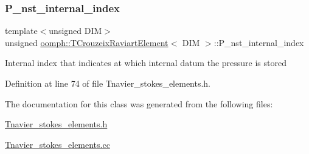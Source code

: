 \subsubsection{\texorpdfstring{P\+\_\+nst\+\_\+internal\+\_\+index}{P\_nst\_internal\_index}}
{\footnotesize\ttfamily template$<$unsigned D\+IM$>$ \\
unsigned \hyperlink{classoomph_1_1TCrouzeixRaviartElement}{oomph\+::\+T\+Crouzeix\+Raviart\+Element}$<$ D\+IM $>$\+::P\+\_\+nst\+\_\+internal\+\_\+index\hspace{0.3cm}{\ttfamily [protected]}}

Internal index that indicates at which internal datum the pressure is stored 

Definition at line 74 of file Tnavier\+\_\+stokes\+\_\+elements.\+h.



The documentation for this class was generated from the following files\+:\begin{DoxyCompactItemize}
\item 
\hyperlink{Tnavier__stokes__elements_8h}{Tnavier\+\_\+stokes\+\_\+elements.\+h}\item 
\hyperlink{Tnavier__stokes__elements_8cc}{Tnavier\+\_\+stokes\+\_\+elements.\+cc}\end{DoxyCompactItemize}
